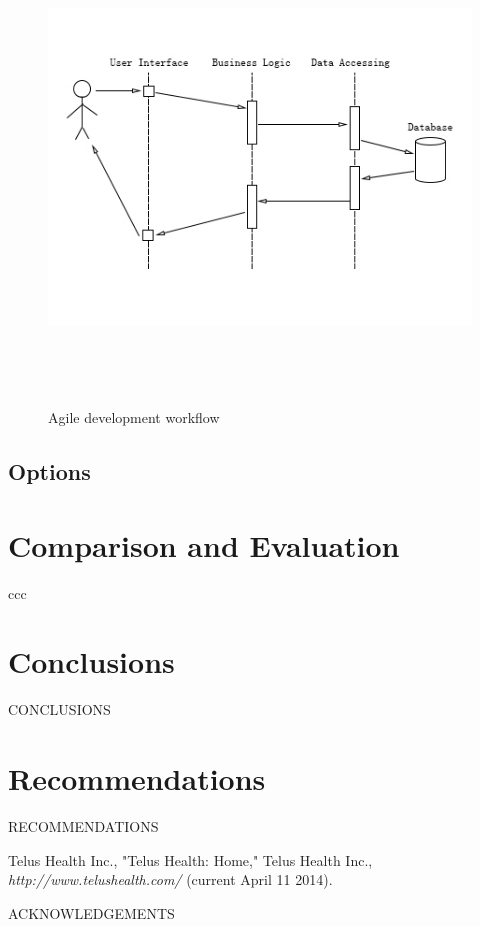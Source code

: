 \documentclass[12pt]{article}
\begin{document}
\begin{figure}[ht!]
\centering
\includegraphics[width=12.5cm,height=12.5cm,keepaspectratio]{img/three_tier.jpg}
\caption{Agile development workflow}
\label{overflow}
\end{figure}
\subsection{Options}

\newpage

\section{Comparison and Evaluation}
ccc


\section{Conclusions}
CONCLUSIONS


\section{Recommendations}
RECOMMENDATIONS


\newpage



\begin{thebibliography}{1}

   Telus Health Inc., "Telus Health: Home," Telus Health Inc., {\em http://www.telushealth.com/} (current April 11 2014).


\end{thebibliography}
\newpage


ACKNOWLEDGEMENTS
\newpage


\end{document}
